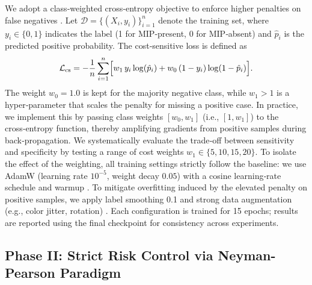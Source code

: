 \documentclass[journal]{IEEEtran}
\theoremstyle{remark}
\begin{document}

We adopt a class‑weighted cross‑entropy objective to enforce higher penalties on false negatives \cite{he2009learning}.  
Let \(\mathcal{D} = \{(X_i, y_i)\}_{i=1}^{n}\) denote the training set, where \(y_i \in \{0,1\}\) indicates the label (1 for MIP‑present, 0 for MIP‑absent) and \(\hat{p}_i\) is the predicted positive probability. The cost‑sensitive loss is defined as  
\begin{equation*}
    \mathcal{L}_{\mathrm{cs}} = - \frac{1}{n} \sum_{i=1}^{n} \Bigl[ w_{1} \, y_i \log(\hat{p}_i) + w_{0} \, (1-y_i) \log(1-\hat{p}_i) \Bigr].
\end{equation*}
The weight \(w_{0}=1.0\) is kept for the majority negative class, while \(w_{1} > 1\) is a hyper‑parameter that scales the penalty for missing a positive case.  
In practice, we implement this by passing class weights \([w_{0}, w_{1}]\) (i.e., \([1, w_{1}]\)) to the cross‑entropy function, thereby amplifying gradients from positive samples during back‑propagation.
We systematically evaluate the trade‑off between sensitivity and specificity by testing a range of cost weights \(w_{1} \in \{5, 10, 15, 20\}\).  To isolate the effect of the weighting, all training settings strictly follow the baseline: we use AdamW \cite{loshchilov2017decoupled} (learning rate \(10^{-5}\), weight decay \(0.05\)) with a cosine learning‑rate schedule and warmup \cite{loshchilov2016sgdr}. To mitigate overfitting induced by the elevated penalty on positive samples, we apply label smoothing 0.1 \cite{szegedy2016rethinking} and strong data augmentation (e.g., color jitter, rotation) \cite{buslaev2020albumentations}. Each configuration is trained for 15 epochs; results are reported using the final checkpoint for consistency across experiments.

\subsection{Phase II: Strict Risk Control via Neyman-Pearson Paradigm}
\label{sec:phase2_method}
\end{document}
